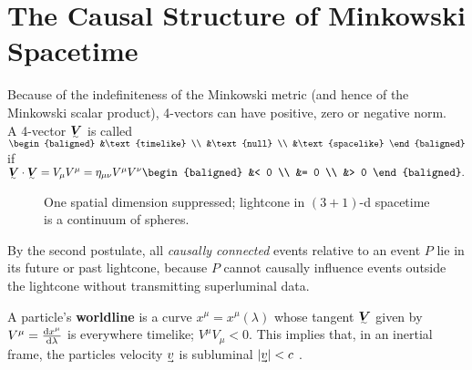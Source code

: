 \section{The Causal Structure of Minkowski Spacetime}

Because of the indefiniteness of the Minkowski metric (and hence of the Minkowski scalar product), 4-vectors can have positive, zero or negative norm.
\\
A 4-vector $\ts V$ is called
\begin{math}
	\begin{baligned}
		&\text{timelike}
	\\	&\text{null}
	\\	&\text{spacelike}
	\end{baligned}
\end{math}
if 
\begin{math}
	\ts V \cdot \ts V = V_\mu V^\mu = \eta_{\mu\nu}V^\mu V^\nu
	\begin{baligned}
		&< 0
	\\	&= 0
	\\	&> 0
	\end{baligned}
.\end{math}

\begin{wrapfigure}[16]{l}{6cm}
	
	\caption*{One spatial dimension suppressed; lightcone in $(3+1)$-d spacetime is a continuum of spheres.}
\end{wrapfigure}
By the second postulate, all \emph{causally connected} events relative to an event $P$ lie in its future or past lightcone, because $P$ cannot causally influence events outside the lightcone without transmitting superluminal data.

A particle's \textbf{worldline} is a curve $x^\mu = x^\mu(\lambda)$ whose tangent $\ts V$ given by $V^\mu = \dv{x^\mu}{\lambda}$ is everywhere timelike; $V^\mu V_\mu < 0$.
This implies that, in an inertial frame, the particles velocity $\uvec v$ is subluminal $|\uvec v| < c$ \exercise.

